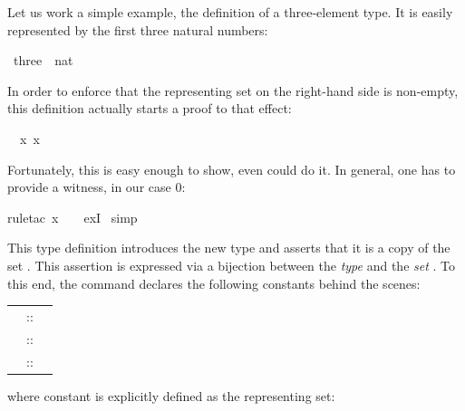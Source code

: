 \begin{isabellebody}
\begin{isamarkuptext}
Let us work a simple example, the definition of a three-element type.
It is easily represented by the first three natural numbers:%
\end{isamarkuptext}%
\isamarkuptrue%
\ three\ {\isacharequal}\ {\isachardoublequote}{\isacharbraceleft}{}{\isacharcolon}{\isacharcolon}nat{\isacharcomma}\ {}{\isacharcomma}\ {}{\isacharbraceright}{\isachardoublequote}\isamarkupfalse%
%
\begin{isamarkuptxt}%
\noindent
In order to enforce that the representing set on the right-hand side is
non-empty, this definition actually starts a proof to that effect:
\begin{isabelle}%
\ {}{\isachardot}\ {\isasymexists}x{\isachardot}\ x\ {\isasymin}\ {\isacharbraceleft}{}{\isacharcomma}\ {}{\isacharcomma}\ {}{\isacharbraceright}%
\end{isabelle}
Fortunately, this is easy enough to show, even  could do it.
In general, one has to provide a witness, in our case 0:%
\end{isamarkuptxt}%
\isamarkuptrue%
rule{\isacharunderscore}tac\ x\ {\isacharequal}\ {}\ \ exI{\isacharparenright}\isanewline
\isamarkupfalse%
\ simp\isamarkupfalse%
%
\begin{isamarkuptext}%
This type definition introduces the new type  and asserts
that it is a copy of the set . This assertion
is expressed via a bijection between the \emph{type}  and the
\emph{set} . To this end, the command declares the following
constants behind the scenes:
\begin{center}
\begin{tabular}{rcl}
\isa{three} &::& \isa{nat\ set} \\
\isa{Rep{\isacharunderscore}three} &::& \isa{three\ {\isasymRightarrow}\ nat}\\
\isa{Abs{\isacharunderscore}three} &::& \isa{nat\ {\isasymRightarrow}\ three}
\end{tabular}
\end{center}
where constant  is explicitly defined as the representing set:
\begin{center}

\end{center}
\end{isamarkuptext}
\end{isabellebody}
